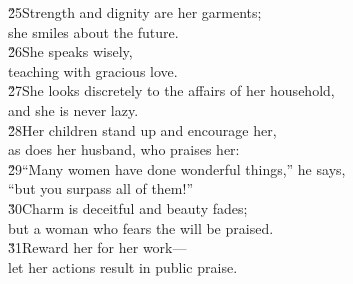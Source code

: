 \begin{poetry}
\poeml \v{25}Strength and dignity are her garments; \\
\poemll    she smiles about the future. \\
\poeml \v{26}She speaks wisely, \\
\poemll    teaching with gracious love. \\
\poeml \v{27}She looks discretely to the affairs of her household, \\
\poemll    and she is never lazy. \\
\poeml \v{28}Her children stand up and encourage her, \\
\poemll    as does her husband, who praises her: \\
\poeml \v{29}``Many women have done wonderful things,'' he says, \\
\poemll    ``but you surpass all of them!'' \\
\poeml \v{30}Charm is deceitful and beauty fades; \\
\poemll    but a woman who fears the  will be praised. \\
\poeml \v{31}Reward her for her work--- \\
\poemll    let her actions result in public praise.\end{poetry}
